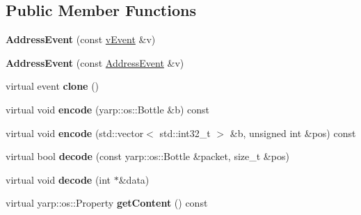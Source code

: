 \subsection*{Public Member Functions}
\begin{DoxyCompactItemize}
\item 
{\bfseries Address\+Event} (const \hyperlink{classev_1_1vEvent}{v\+Event} \&v)\hypertarget{classev_1_1AddressEvent_a62e810ce50e155828957e61c99a165d2}{}\label{classev_1_1AddressEvent_a62e810ce50e155828957e61c99a165d2}

\item 
{\bfseries Address\+Event} (const \hyperlink{classev_1_1AddressEvent}{Address\+Event} \&v)\hypertarget{classev_1_1AddressEvent_a5072b43ca93fdcdf0294ecff78f3b424}{}\label{classev_1_1AddressEvent_a5072b43ca93fdcdf0294ecff78f3b424}

\item 
virtual event {\bfseries clone} ()\hypertarget{classev_1_1AddressEvent_adabe75246de88f722d65b4994c7955eb}{}\label{classev_1_1AddressEvent_adabe75246de88f722d65b4994c7955eb}

\item 
virtual void {\bfseries encode} (yarp\+::os\+::\+Bottle \&b) const \hypertarget{classev_1_1AddressEvent_a38b726cef241624c31312a3eb1f46730}{}\label{classev_1_1AddressEvent_a38b726cef241624c31312a3eb1f46730}

\item 
virtual void {\bfseries encode} (std\+::vector$<$ std\+::int32\+\_\+t $>$ \&b, unsigned int \&pos) const \hypertarget{classev_1_1AddressEvent_a066312dfce8e66a1c4402a40d43300bc}{}\label{classev_1_1AddressEvent_a066312dfce8e66a1c4402a40d43300bc}

\item 
virtual bool {\bfseries decode} (const yarp\+::os\+::\+Bottle \&packet, size\+\_\+t \&pos)\hypertarget{classev_1_1AddressEvent_aadf6cc5f4681b4c4028ac2be4317ed55}{}\label{classev_1_1AddressEvent_aadf6cc5f4681b4c4028ac2be4317ed55}

\item 
virtual void {\bfseries decode} (int $\ast$\&data)\hypertarget{classev_1_1AddressEvent_aa47fe5c9052f8321a136835c38c0f8b2}{}\label{classev_1_1AddressEvent_aa47fe5c9052f8321a136835c38c0f8b2}

\item 
virtual yarp\+::os\+::\+Property {\bfseries get\+Content} () const \hypertarget{classev_1_1AddressEvent_ad235efba4a6bd3fc79b853ecefad88c9}{}\label{classev_1_1AddressEvent_ad235efba4a6bd3fc79b853ecefad88c9}


\end{DoxyCompactItemize}
